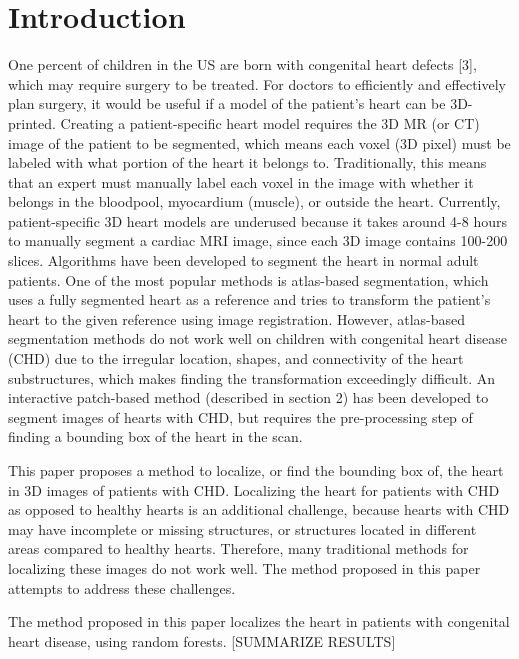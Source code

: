 \section{Introduction}
One percent of children in the US are born with congenital heart defects [3], which may require surgery to be treated. For doctors to efficiently and effectively plan surgery, it would be useful if a model of the patient's heart can be 3D-printed. Creating a patient-specific heart model requires the 3D MR (or CT) image of the patient to be segmented, which means each voxel (3D pixel) must be labeled with what portion of the heart it belongs to. Traditionally, this means that an expert must manually label each voxel in the image with whether it belongs in the bloodpool, myocardium (muscle), or outside the heart. Currently, patient-specific 3D heart models are underused because it takes around 4-8 hours to manually segment a cardiac MRI image, since each 3D image contains 100-200 slices. Algorithms have been developed to segment the heart in normal adult patients. One of the most popular methods is atlas-based segmentation, which uses a fully segmented heart as a reference and tries to transform the patient's heart to the given reference using image registration. However, atlas-based segmentation methods do not work well on children with congenital heart disease (CHD) due to the irregular location, shapes, and connectivity of the heart substructures, which makes finding the transformation exceedingly difficult. An interactive patch-based method (described in section 2) has been developed to segment images of hearts with CHD, but requires the pre-processing step of finding a bounding box of the heart in the scan.

This paper proposes a method to localize, or find the bounding box of, the heart in 3D images of patients with CHD. Localizing the heart for patients with CHD as opposed to healthy hearts is an additional challenge, because hearts with CHD may have incomplete or missing structures, or structures located in different areas compared to healthy hearts. Therefore, many traditional methods for localizing these images do not work well. The method proposed in this paper attempts to address these challenges.

The method proposed in this paper localizes the heart in patients with congenital heart disease, using random forests. [SUMMARIZE RESULTS]

